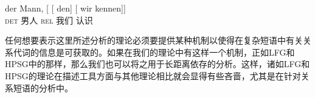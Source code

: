 \ea
\gll der Mann, [ [ den] [ wir kennen]]\\
	 \textsc{det} 男人 {} {} \textsc{rel} {} 我们 认识\\
\z
\begin{sloppypar}
\noindent
任何想要表示这里所述分析的理论必须要提供某种机制以使得在复杂短语中有关关系代词的信息是可获取的。如果在我们的理论中有这样一个机制，正如LFG和HPSG中的那样\indexlfgc，那么我们也可以将之用于长距离依存的分析。这样，诸如LFG和HPSG的理论在描述工具方面与其他理论相比就会显得有些吝啬，尤其是在针对关系短语的分析中。
\end{sloppypar}

